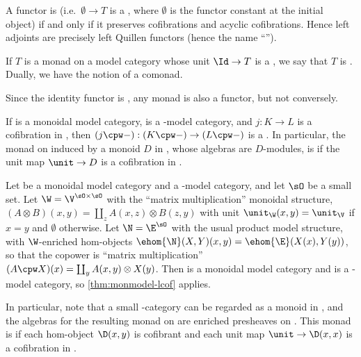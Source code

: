 \begin{eg}
  A functor is \textbf{\qcoft} (i.e.\ $\emptyset \to T$ is a \qcof, where $\emptyset$ is the functor constant at the initial object) if and only if it preserves cofibrations and acyclic cofibrations.
  Hence \qcoft left adjoints are precisely left Quillen functors (hence the name ``\qcof'').
\end{eg}

\begin{defn}
  If $T$ is a monad on a model category whose unit $\Id\to T$ is a \qcof, we say that $T$ is \textbf{\qucoft}.
  Dually, we have the notion of a \textbf{\qufibt} comonad.
\end{defn}

Since the identity functor is \qcoft, any \qucoft monad is also a \qcoft functor, but not conversely.

\begin{eg}\label{thm:monmodel-lcof}
  If \V is a monoidal model category, \N is a \V-model category, and $j:K\to L$ is a cofibration in \V, then $(j\cpw -) : (K\cpw -) \to (L\cpw -)$ is a \qcof.
  In particular, the monad on \N induced by a monoid $D$ in \V, whose algebras are $D$-modules, is \qucoft if the unit map $\unit\to D$ is a cofibration in \V.
\end{eg}

\begin{eg}\label{eg:mat}
  Let \V be a monoidal model category and \E a \V-model category, and let $\sO$ be a small set.
  Let $\W=\V^{\sO\times\sO}$ with the ``matrix multiplication'' monoidal structure, $(A\otimes B)(x,y) = \coprod_z A(x,z) \otimes B(z,y)$ with unit $\unit_\W(x,y) = \unit_\V$ if $x=y$ and $\emptyset$ otherwise.
  Let $\N = \E^\sO$ with the usual product model structure, with $\W$-enriched hom-objects $\ehom{\N}(X,Y)(x,y) = \ehom{\E}(X(x),Y(y))$, so that the copower is ``matrix multiplication'' $(A\cpw X)(x) = \coprod_y A(x,y) \otimes X(y)$.
  Then \W is a %
  monoidal model category and \N is a \W-model category, so \cref{thm:monmodel-lcof} applies.

  In particular, note that a small \V-category \D can be regarded as a monoid in \W, and the algebras for the resulting monad on \N are enriched presheaves on \D.
  This monad is \qucoft if each hom-object $\D(x,y)$ is cofibrant and each unit map $\unit \to\D(x,x)$ is a cofibration in \V.
\end{eg}

